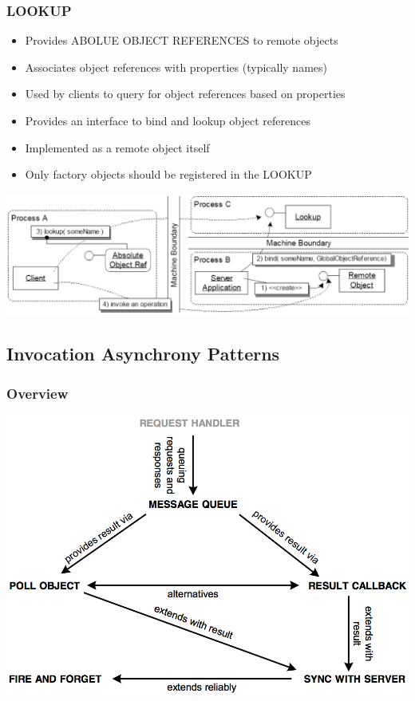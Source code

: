 \documentclass[10pt]{article}
\begin{document}
\subsubsection{LOOKUP}
\begin{itemize}
	\item Provides ABOLUE OBJECT REFERENCES to remote objects
	\item Associates object references with properties (typically names)
	\item Used by clients to query for object references based on properties
	\item Provides an interface to bind and lookup object references
	\item Implemented as a remote object itself
	\item Only factory objects should be registered in the LOOKUP
\end{itemize}
\begin{center}
	\includegraphics[scale=0.2]{lookup.png}
\end{center}
\subsection{Invocation Asynchrony Patterns}
\subsubsection{Overview}
\begin{center}
	\includegraphics[scale=0.3]{invocation-asynchrony-patterns.png}
\end{center}
\end{document}
